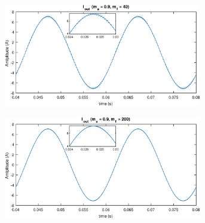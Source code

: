 \begin{figure}[h]
\begin{subfigure}{0.49\textwidth}
	\centering
	\includegraphics[width=0.95\textwidth]{Images/2_I_out_40.eps}
\end{subfigure}
\begin{subfigure}{0.49\textwidth}
	\centering
	\includegraphics[width=0.95\textwidth]{Images/2_I_out_200.eps}
\end{subfigure}
\end{figure}